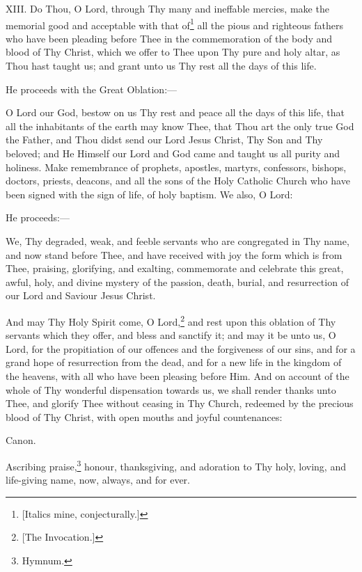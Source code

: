 XIII. Do Thou, O Lord, through Thy many and ineffable mercies, make the memorial good and acceptable with that of\footnote{\par{}  [Italics mine, conjecturally.]} all the pious and righteous fathers who have been pleading before Thee in the commemoration of the body and blood of Thy Christ, which we offer to Thee upon Thy pure and holy altar, as Thou hast taught us; and grant unto us Thy rest all the days of this life.

He proceeds with the Great Oblation:—

O Lord our God, bestow on us Thy rest and peace all the days of this life, that all the inhabitants of the earth may know Thee, that Thou art the only true God the Father, and Thou didst send our Lord Jesus Christ, Thy Son and Thy beloved; and He Himself our Lord and God came and taught us all purity and holiness. Make remembrance of prophets, apostles, martyrs, confessors, bishops, doctors, priests, deacons, and all the sons of the Holy Catholic Church who have been signed with the sign of life, of holy baptism. We also, O Lord:

He proceeds:—

We, Thy degraded, weak, and feeble servants who are congregated in Thy name, and now stand before Thee, and have received with joy the form which is from Thee, praising, glorifying, and exalting, commemorate and celebrate this great, awful, holy, and divine mystery of the passion, death, burial, and resurrection of our Lord and Saviour Jesus Christ.

And may Thy Holy Spirit come, O Lord,\footnote{\par{}  [The Invocation.]} and rest upon this oblation of Thy servants which they offer, and bless and sanctify it; and may it be unto us, O Lord, for the propitiation of our offences and the forgiveness of our sins, and for a grand hope of resurrection from the dead, and for a new life in the kingdom of the heavens, with all who have been pleasing before Him. And on account of the whole of Thy wonderful dispensation towards us, we shall render thanks unto Thee, and glorify Thee without ceasing in Thy Church, redeemed by the precious blood of Thy Christ, with open mouths and joyful countenances:

Canon.

Ascribing praise,\footnote{\par  Hymnum.} honour, thanksgiving, and adoration to Thy holy, loving, and life-giving name, now, always, and for ever.

